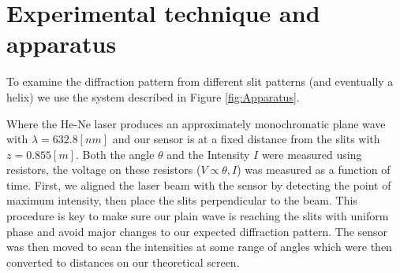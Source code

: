 \section{Experimental technique and apparatus}
To examine the diffraction pattern from different slit patterns (and eventually a helix) we use the system described in Figure \ref{fig:Apparatus}.

Where the He-Ne laser produces an approximately monochromatic plane wave with $\lambda=632.8 [nm]$ and our sensor is at a fixed distance from the slits with $z=0.855 [m]$.
Both the angle $\theta$ and the Intensity $I$ were measured using resistors, the voltage on these resistors ($V\propto\theta,I$) was measured as a function of time.
First, we aligned the laser beam with the sensor by detecting the point of maximum intensity, then place the slits perpendicular to the beam.
This procedure is key to make sure our plain wave is reaching the slits with uniform phase and avoid major changes to our expected diffraction pattern.
The sensor was then moved to scan the intensities at some range of angles which were then converted to distances on our theoretical screen.
